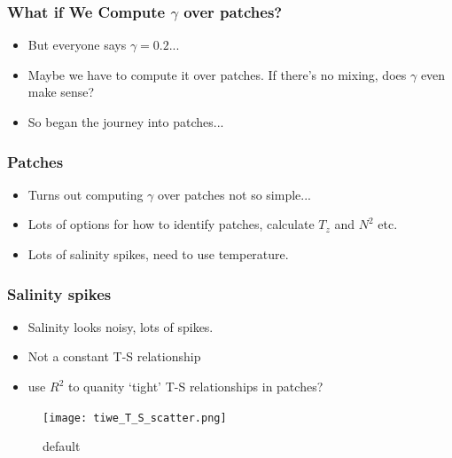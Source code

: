 \documentclass{beamer}
\begin{document}
\begin{frame}
 \frametitle{What if We Compute $\gamma$ over patches?}
\begin{itemize}
\item But everyone says $\gamma=0.2$...
\item Maybe we have to compute it over patches. If there's no mixing, does $\gamma$ even make sense?
\item So began the journey into patches...
\end{itemize}

\end{frame}





\begin{frame}
 \frametitle{Patches}
\begin{itemize}
\item Turns out computing $\gamma$ over patches not so simple...
\item Lots of options for how to identify patches, calculate $T_z$ and $N^2$ etc.
\item Lots of salinity spikes, need to use temperature.
\end{itemize}

\end{frame}



\begin{frame}
 \frametitle{Salinity spikes}
\begin{itemize}
\item Salinity looks noisy, lots of spikes.
\item Not a constant T-S relationship 
\item use $R^2$ to quanity `tight' T-S relationships in patches?
\end{itemize}


\begin{figure}[htbp]
\begin{center}
\texttt{[image: tiwe\_T\_S\_scatter.png]}
\caption{default}
\label{default}
\end{center}
\end{figure}


\end{frame}
\end{document}
